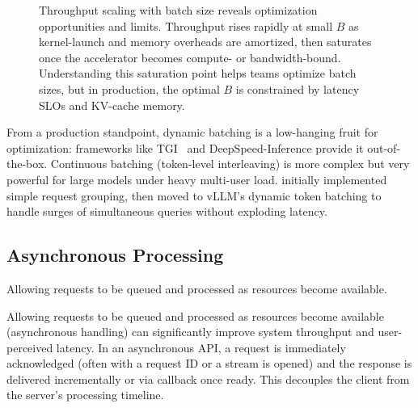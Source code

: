 \begin{figure}[t]
\centering
\begin{llmfigbox}
\end{llmfigbox}
\caption{Throughput scaling with batch size reveals optimization opportunities and limits. Throughput rises rapidly at small $B$ as kernel-launch and memory overheads are amortized, then saturates once the accelerator becomes compute- or bandwidth-bound. Understanding this saturation point helps teams optimize batch sizes, but in production, the optimal $B$ is constrained by latency SLOs and KV-cache memory.}
\label{fig:ch07_throughput_vs_batch}
\end{figure}



From a production standpoint, dynamic batching is a low-hanging fruit for optimization: frameworks like TGI~\cite{tgi-whitepaper} and DeepSpeed-Inference provide it out-of-the-box. Continuous batching (token-level interleaving) is more complex but very powerful for large models under heavy multi-user load. \ishtar{} initially implemented simple request grouping, then moved to vLLM’s dynamic token batching to handle surges of simultaneous queries without exploding latency.

\subsection{Asynchronous Processing}
\label{sec:perf-async}
Allowing requests to be queued and processed as resources become available.

Allowing requests to be queued and processed as resources become available (asynchronous handling) can significantly improve system throughput and user-perceived latency. In an asynchronous API, a request is immediately acknowledged (often with a request ID or a stream is opened) and the response is delivered incrementally or via callback once ready. This decouples the client from the server’s processing timeline.

